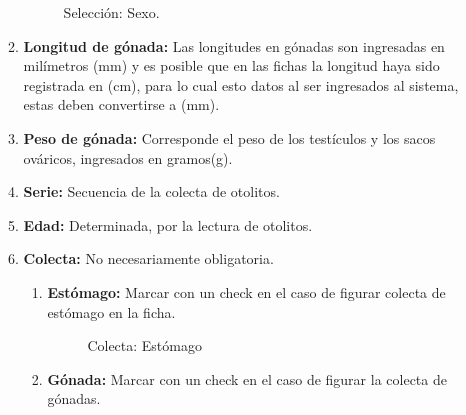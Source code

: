 \documentclass[a4paper,oneside,11pt]{book}
\begin{document}
\begin{itemize}
\begin{enumerate}
\begin{figure} [!h]
\begin{center}
\caption{Selección: Sexo.}
\end{center}
\end{figure}



\item \textbf{Longitud de gónada: } Las longitudes en gónadas son ingresadas en milímetros (mm) y es posible que en las fichas la longitud haya sido registrada en (cm), para lo cual esto datos al ser ingresados al sistema, estas deben convertirse a (mm).
 
 
\item \textbf{Peso de gónada:} Corresponde el peso de los testículos y los sacos ováricos, ingresados en gramos(g).


\item \textbf{Serie:} Secuencia de la colecta de otolitos.
\item \textbf{Edad:} Determinada, por la lectura de otolitos.
\item \textbf{Colecta:} No necesariamente obligatoria.
\begin{enumerate}
\item \textbf{Estómago:} Marcar con un check en el caso de figurar colecta de estómago en la ficha.

\begin{figure} [!h]
\begin{center}
\caption{Colecta: Estómago}
\end{center}
\end{figure}

\item \textbf {Gónada:} Marcar con un check  en el caso de figurar la colecta de gónadas. 
\end{enumerate}
\end{enumerate}



\end{itemize}
\end{document}
